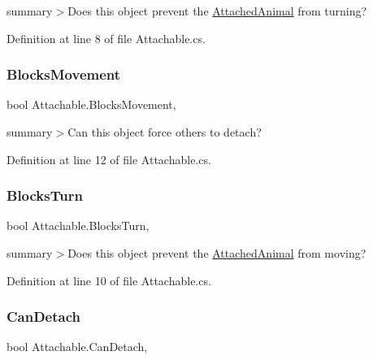 summary$>$Does this object prevent the \mbox{\hyperlink{class_attachable_a767ba973f26c60f69dd597c9bb3cdf61}{Attached\+Animal}} from turning?



Definition at line 8 of file Attachable.\+cs.

\mbox{\label{class_attachable_acfc4ace299ec00b5bdf02bec42a1ba35}} 
\subsubsection{\texorpdfstring{Blocks\+Movement}{BlocksMovement}}
{\footnotesize\ttfamily bool Attachable.\+Blocks\+Movement\hspace{0.3cm}{\ttfamily [get]}, {}}



summary$>$Can this object force others to detach?



Definition at line 12 of file Attachable.\+cs.

\mbox{\label{class_attachable_a57e1cb75b892a9acb9a55c68859d6ced}} 
\subsubsection{\texorpdfstring{Blocks\+Turn}{BlocksTurn}}
{\footnotesize\ttfamily bool Attachable.\+Blocks\+Turn\hspace{0.3cm}{\ttfamily [get]}, {}}



summary$>$Does this object prevent the \mbox{\hyperlink{class_attachable_a767ba973f26c60f69dd597c9bb3cdf61}{Attached\+Animal}} from moving?



Definition at line 10 of file Attachable.\+cs.

\mbox{\label{class_attachable_a569316796ad397c633f321fb40d2dcd8}} 
\subsubsection{\texorpdfstring{Can\+Detach}{CanDetach}}
{\footnotesize\ttfamily bool Attachable.\+Can\+Detach\hspace{0.3cm}{\ttfamily [get]}, {}}



